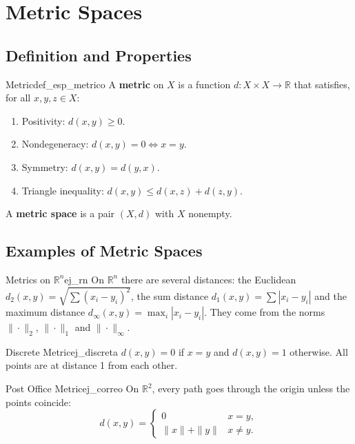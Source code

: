 \documentclass[11pt, a4paper]{article}
\begin{document}
\newpage

\section{Metric Spaces}

\subsection{Definition and Properties}

\begin{definicion}{Metric}{def_esp_metrico}
A \textbf{metric} on $X$ is a function $d: X \times X \to \mathbb{R}$ that satisfies, for all
$x, y, z \in X$:
\begin{enumerate}
    \item Positivity: $d(x, y) \ge 0$.
    \item Nondegeneracy: $d(x, y) = 0 \iff x = y$.
    \item Symmetry: $d(x, y) = d(y, x)$.
    \item Triangle inequality: $d(x, y) \le d(x, z) + d(z, y)$.
\end{enumerate}
A \textbf{metric space} is a pair $(X, d)$ with $X$ nonempty.
\end{definicion}

\subsection{Examples of Metric Spaces}

\begin{ejemplo}{Metrics on $\mathbb{R}^n$}{ej_rn}
On $\mathbb{R}^n$ there are several distances: the Euclidean $d_2(x,y) = \sqrt{\sum (x_i-y_i)^2}$, the
sum distance $d_1(x,y) = \sum |x_i - y_i|$ and the maximum distance $d_\infty(x,y) = \max_i |x_i - y_i|$. They come from
the norms $\|\cdot\|_2$, $\|\cdot\|_1$ and $\|\cdot\|_\infty$.
\end{ejemplo}

\begin{ejemplo}{Discrete Metric}{ej_discreta}
$d(x,y) = 0$ if $x = y$ and $d(x,y) = 1$ otherwise. All points are at distance 1 from each other.
\end{ejemplo}

\begin{ejemplo}{Post Office Metric}{ej_correo}
On $\mathbb{R}^2$, every path goes through the origin unless the points coincide:
$$ d(x,y) = \begin{cases} 0 & x = y, \\ \|x\| + \|y\| & x \ne y. \end{cases} $$
\end{ejemplo}
\end{document}
